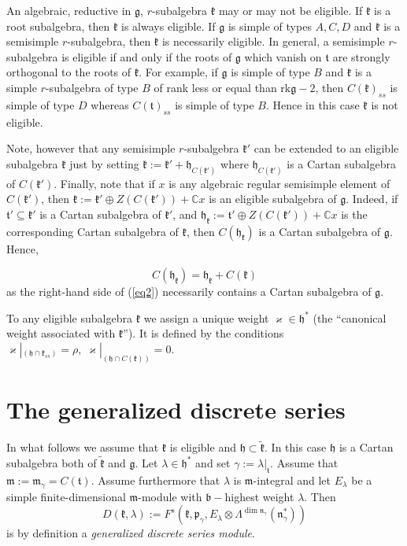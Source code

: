\documentclass[10pt]{amsart}
\newcommand{\rk}{\mathrm{rk}}
\newcommand{\bb}{\mathfrak{b}}
\renewcommand{\gg}{\mathfrak{g}}
\newcommand{\hh}{\mathfrak{h}}
\newcommand{\kk}{\mathfrak{k}}
\newcommand{\mm}{\mathfrak{m}}
\newcommand{\nn}{\mathfrak{n}}
\newcommand{\pp}{\mathfrak{p}}
\renewcommand{\tt}{\mathfrak{t}}
\begin{document}
\vspace{0.3cm}

An algebraic, reductive in $\gg$, $r$-subalgebra $\kk$ may or may not be eligible. If $\kk$ is a root subalgebra, then $\kk$ is always eligible. If $\gg$ is simple of types $A,C,D$ and $\kk$ is a semisimple $r$-subalgebra, then $\kk$ is necessarily eligible. In general, a semisimple $r$-subalgebra is eligible if and only if the roots of $\gg$ which vanish on $\tt$ are strongly orthogonal to the roots of $\kk$. For example, if $\gg$ is simple of type $B$ and $\kk$ is a simple $r$-subalgebra of type $B$ of rank less or equal than $\rk\gg-2$, then $C(\kk)_{ss}$ is simple of type $D$ whereas $C(\tt)_{ss}$ is simple of type $B$. Hence in this case $\kk$ is not eligible.

Note, however that any semisimple $r$-subalgebra $\kk '$ can be extended to an eligible subalgebra $\kk$ just by setting $\kk:=\kk '+\hh_{C(\kk ')}$ where $\hh_{C(\kk ')}$ is a Cartan subalgebra of $C(\kk ')$. Finally, note that if $x$ is any algebraic regular semisimple element of $C(\kk ')$, then $\kk:= \kk'\oplus Z(C(\kk')) +\mathbb{C}x$ is an eligible subalgebra of $\gg$. Indeed, if $\tt '\subseteq\kk '$ is a Cartan subalgebra of $\kk '$, and $\hh_{\kk} := \tt' \oplus Z(C(\kk')) + \mathbb{C}x$ is the corresponding Cartan subalgebra of $\kk$, then $C(\hh_{\kk})$ is a Cartan subalgebra of $\gg$. Hence, 

\begin{equation}\label{eq2}
    C(\hh_{\kk})=\hh_{\kk}+C(\kk)
\end{equation}
as the right-hand side of (\ref{eq2}) necessarily contains a Cartan subalgebra of $\gg$.

To any eligible subalgebra $\kk$ we assign a unique weight $\varkappa\in\hh^*$ (the ``canonical weight associated with $\kk$''). It is defined by the conditions $\varkappa|_{(\hh\cap\kk_{ss})}=\rho,\; \varkappa|_{(\hh\cap C(\kk))}=0$.

\section{The generalized discrete series}\label{sect:5}

In what follows we assume that $\kk$ is eligible and $\hh \subset \tilde{\kk}$. In this case $\hh$ is a Cartan subalgebra both of $\tilde{\kk}$ and $\gg$. Let $\lambda\in\hh^*$ and set $\gamma := \lambda|_{\tt}$. Assume that $\mm:=\mm_{\gamma}=C(\tt)$. Assume furthermore that $\lambda$ is $\mm$-integral and let $E_\lambda$ be a simple finite-dimensional $\mm$-module with $\bb-$highest weight $\lambda$. Then $$D(\kk,\lambda):=F^s(\kk,\pp_{\gamma},E_\lambda\otimes\Lambda^{\dim\nn_{\gamma}}(\nn_{\gamma}^*))$$
is by definition a \textit{generalized discrete series module}.
\end{document}
